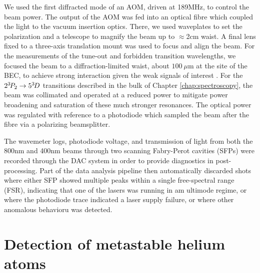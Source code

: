 	

	We used the first diffracted mode of an AOM, driven at 189MHz, to control the beam power.
	The output of the AOM was fed into an optical fibre which coupled the light to the vacuum insertion optics.
	There, we used waveplates to set the polarization and a telescope to magnify the beam up to $\approx$2cm waist.
	A final lens fixed to a three-axis translation mount was used to focus and align the beam.
	For the measurements of the tune-out and forbidden transition wavelengths, we focused the beam to a diffraction-limited waist, about $100~\mu$m at the site of the BEC, to achieve strong interaction given the weak signals of interest .
	For the $2^{3\!} P_2\rightarrow 5^{3\!} D$ transitions described in the bulk of Chapter \ref{chap:spectroscopy}, the beam was collimated and operated at a reduced power to mitigate power broadening and saturation of these much stronger resonances.
	The optical power was regulated with reference to a photodiode which sampled the beam after the fibre via a polarizing beamsplitter.

	The wavemeter logs, photodiode voltage, and transmission of light from both the 800nm and 400nm beams through two scanning Fabry-Perot cavities (SFPs) were recorded through the DAC system in order to provide diagnostics in post-processing.
	Part of the data analysis pipeline then automatically discarded shots where either SFP showed multiple peaks within a single free-spectral range (FSR), indicating that one of the lasers was running in am ultimode regime, or where the photodiode trace indicated a laser supply failure, or where other anomalous behavioru was detected.



\section{Detection of metastable helium atoms}

